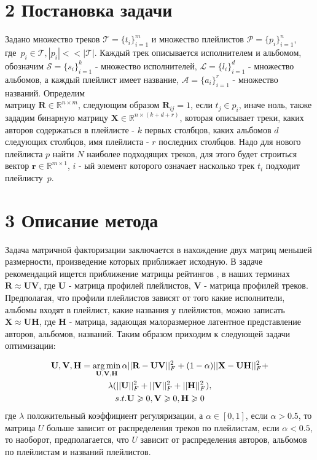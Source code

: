 \documentclass[12pt,twoside]{article}
\begin{document}
\section{2 Постановка задачи}

{Задано множество треков $\mathcal{T} = \{t_i\}_{i=1}^m$ и множество плейлистов $\mathcal{P} = \{p_i\}_{i=1}^{n}$, \\где~$p_i \in \mathcal{T}, |p_i| << |\mathcal{T}|$. Каждый трек описывается исполнителем и альбомом, обозначим $\mathcal{S} = \{s_i\}_{i=1}^{k}$ - множество исполнителей, $\mathcal{L} = \{l_i\}_{i=1}^d$ - множество альбомов, а каждый плейлист имеет название, $\mathcal{A} = \{a_i\}_{i=1}^{r}$ - множество названий. Определим \\матрицу $\mathbf{R} \in \mathbb{R}^{n \times m}$, следующим образом $\mathbf{R}_{ij} = 1$, если $t_j \in p_i$, иначе ноль, также зададим бинарную матрицу $\mathbf{X} \in \mathbb{R}^{n \times (k + d + r)}$, которая описывает треки, каких авторов содержаться в плейлисте - $k$ первых столбцов, каких альбомов $d$ следующих столбцов, имя плейлиста - $r$ последних столбцов. Надо для нового плейлиста $p$ найти $N$ наиболее подходящих треков, для этого будет строиться вектор $\mathbf{r} \in \mathbb{R}^{m \times 1}$, $i$ - ый элемент которого означает насколько трек $t_i$ подходит плейлисту~$p$.}

\section{3 Описание метода}

{Задача матричной факторизации заключается в нахождение двух матриц меньшей размерности, произведение которых приближает исходную. В задаче рекомендаций ищется приближение матрицы рейтингов , в наших терминах  $\mathbf{R} \approx \mathbf{UV}$, где $\mathbf{U}$ - матрица профилей плейлистов, $\mathbf{V}$ - матрица профилей треков. Предполагая, что профили плейлистов зависят от того какие исполнители, альбомы входят в плейлист, какие названия у плейлистов, можно записать $\mathbf{X} \approx \mathbf{UH}$, где $\mathbf{H}$ - матрица, задающая малоразмерное латентное представление авторов, альбомов, названий. Таким образом приходим к следующей задачи оптимизации:

\begin{equation}
\begin{gathered}
\mathbf{U, V, H} = \argmin_{\mathbf{U, V, H}}\alpha||\mathbf{R} - \mathbf{UV}||_F^2 +(1 - \alpha) ||\mathbf{X} - \mathbf{UH}||_F^2 + \\
 \lambda(||\mathbf{U}||_F^2 + ||\mathbf{V}||_F^2 + ||\mathbf{H}||_F^2),\\
 s.t. \mathbf{U} \geq 0,  \mathbf{V} \geq 0,  \mathbf{H} \geq 0$$
\end{gathered}
\end{equation}
где $\lambda$ положительный коэффициент регуляризации, а $\alpha \in [0, 1]$, если $\alpha > 0.5$, то матрица $U$ больше зависит от распределения треков по плейлистам, если $\alpha < 0.5$, то наоборот, предполагается, что $U$ зависит от распределения авторов, альбомов по плейлистам и названий плейлистов. }
\end{document}
